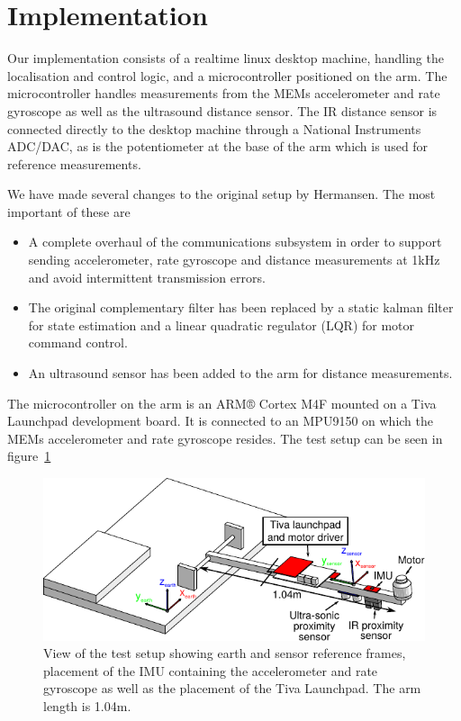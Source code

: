 \section{Implementation}\label{sec:implemenation}
Our implementation consists of a realtime linux desktop machine, handling the localisation and control logic, and a microcontroller
positioned on the arm. The microcontroller handles measurements from the MEMs accelerometer and rate gyroscope as well as the ultrasound
distance sensor. The IR distance sensor is connected directly to the desktop machine through a National Instruments ADC/DAC, as is the 
potentiometer at the base of the arm which is used for reference measurements.

We have made several changes to the original setup by Hermansen. The most important of these are

\begin{itemize}
		\item A complete overhaul of the communications subsystem in order to support sending accelerometer, rate gyroscope and 
			distance measurements at 1kHz and avoid intermittent transmission errors. 
		\item The original complementary filter has been replaced by a static kalman filter for state estimation and a linear 
			quadratic regulator (LQR)\cite{Hendricks2008} for motor command control.
			\item An ultrasound sensor has been added to the arm for distance measurements.
\end{itemize}

The microcontroller on the arm is an ARM® Cortex M4F mounted on a Tiva Launchpad development board.
It is connected to an MPU9150 on which the MEMs accelerometer and rate gyroscope resides.
The test setup can be seen in figure~\ref{fig:labsetup}
\begin{figure}
	\centering
	\includegraphics[width=\columnwidth]{pictures/arbejds_tegning}
	\caption{View of the test setup showing earth and sensor reference frames, placement of the IMU containing the 
	accelerometer and rate gyroscope as well as the placement of the Tiva Launchpad. The arm length is 1.04m.}
	\label{fig:labsetup}
\end{figure}

